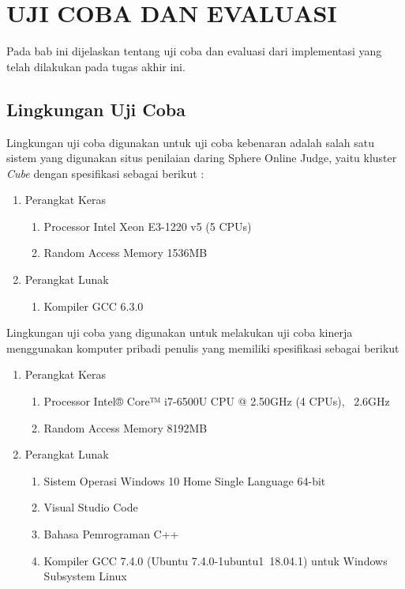\chapter{UJI COBA DAN EVALUASI}

Pada bab ini dijelaskan tentang uji coba dan evaluasi dari implementasi yang telah dilakukan pada tugas akhir ini.
\section{ Lingkungan Uji Coba}
Lingkungan uji coba digunakan untuk uji coba kebenaran adalah salah satu sistem yang digunakan situs penilaian daring Sphere Online Judge, yaitu kluster \textit{Cube} dengan spesifikasi sebagai berikut :
\begin{enumerate}
	\item Perangkat Keras
	\begin{enumerate}
		\item Processor Intel Xeon E3-1220 v5 (5 CPUs)
		\item Random Access Memory 1536MB
	\end{enumerate}
	\item Perangkat Lunak
	\begin{enumerate}
		\item Kompiler GCC 6.3.0
	\end{enumerate}
\end{enumerate}

Lingkungan uji coba yang digunakan untuk melakukan uji coba kinerja menggunakan komputer pribadi penulis yang memiliki spesifikasi sebagai berikut
\begin{enumerate}
	\item Perangkat Keras
	\begin{enumerate}
		\item Processor Intel® Core™ i7-6500U CPU @ 2.50GHz (4 CPUs), ~2.6GHz
		\item Random Access Memory 8192MB
	\end{enumerate}
	\item Perangkat Lunak
	\begin{enumerate}
		\item Sistem Operasi Windows 10 Home Single Language 64-bit
		\item Visual Studio Code
		\item Bahasa Pemrograman C++
		\item Kompiler GCC 7.4.0 (Ubuntu 7.4.0-1ubuntu1~18.04.1) untuk Windows Subsystem Linux
	\end{enumerate}
\end{enumerate}

